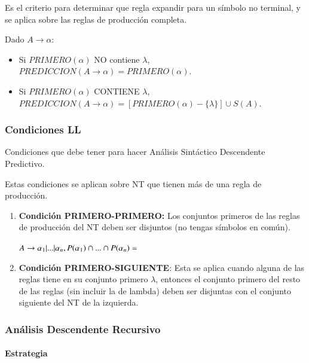 \documentclass[12pt]{report} %
\begin{document}
Es el criterio para determinar que regla expandir para un símbolo no
terminal, y se aplica sobre las reglas de producción completa.

Dado \(A \rightarrow \alpha\):

\begin{itemize}

\item
  Si \(PRIMERO(\alpha)\) NO contiene \(\lambda\),
  \(PREDICCION(A \rightarrow \alpha) = PRIMERO(\alpha)\).
\item
  Si \(PRIMERO(\alpha)\) CONTIENE \(\lambda\),
  \(PREDICCION(A\rightarrow\alpha) = [PRIMERO(\alpha)-\{\lambda\}] \cup S(A)\).
\end{itemize}


\subsubsection{Condiciones LL}

Condiciones que debe tener para hacer Análisis Sintáctico Descendente
Predictivo.

Estas condiciones se aplican sobre NT que tienen más de una regla de
producción.

\begin{enumerate}
\def\labelenumi{\arabic{enumi}.}

\item
  \textbf{Condición PRIMERO-PRIMERO:} Los conjuntos primeros de las
  reglas de producción del NT deben ser disjuntos (no tengas símbolos en
  común).

  \(A \rightarrow \alpha_1 |...|\alpha_n, P(\alpha_1) \cap ... \cap P(\alpha_n) = \empty\)
\item
  \textbf{Condición PRIMERO-SIGUIENTE}: Esta se aplica cuando alguna de
  las reglas tiene en su conjunto primero \(\lambda\), entonces el
  conjunto primero del resto de las reglas (sin incluir la de lambda)
  deben ser disjuntas con el conjunto siguiente del NT de la izquierda.
\end{enumerate}


\subsubsection{Análisis Descendente Recursivo}


\paragraph{Estrategia}
\end{document}
